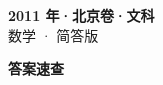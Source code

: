 \documentclass[zihao=-4, a4paper]{ctexart}
\begin{document}
\begin{center}
  {\Large\bfseries 2011 年·北京卷·文科}\\[4pt]
  {\large 数学 · 简答版}
\end{center}
\medskip
{}

\clearpage
{}
\begin{center}{\Large\bfseries 答案速查}\end{center}
\medskip

\end{document}
